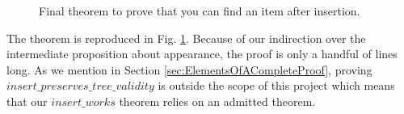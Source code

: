 \begin{figure}
  
  \caption{Final theorem to prove that you can find an item after insertion.}
  \label{fig:insert_works}
\end{figure}

The theorem is reproduced in Fig. \ref{fig:insert_works}. Because of our indirection over the intermediate proposition about appearance, the proof is only a handful of lines long. As we mention in Section \ref{sec:ElementsOfACompleteProof}, proving $insert\_preserves\_tree\_validity$ is outside the scope of this project which means that our $insert\_works$ theorem relies on an admitted theorem. 
